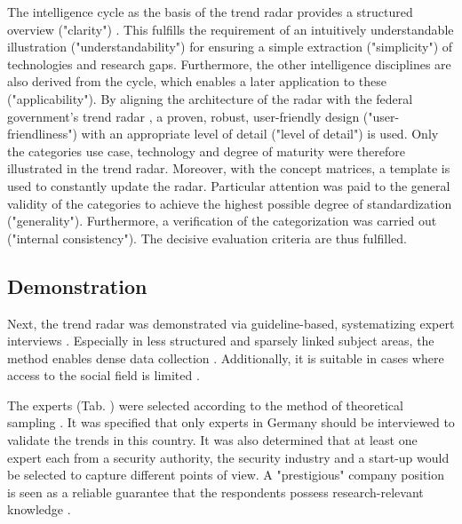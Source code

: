 \documentclass[10pt]{article}
\begin{document}
The intelligence cycle as the basis of the trend radar provides a
structured overview ("clarity") \cite{Breakspear.2013}. This
fulfills the requirement of an intuitively understandable illustration
("understandability") for ensuring a simple extraction ("simplicity")
of technologies and research gaps. Furthermore, the other intelligence
disciplines are also derived from the cycle, which enables a later
application to these ("applicability"). By aligning the
architecture of the radar with the federal government's trend radar
\cite{Stich.2022}, a proven, robust, user-friendly
design ("user-friendliness") with an appropriate level of detail
("level of detail") is used. Only the categories use case, technology and
degree of maturity were therefore illustrated in the trend radar. Moreover, with the concept matrices, a
template is used to constantly update the radar. Particular attention
was paid to the general validity of the categories to achieve
the highest possible degree of standardization ("generality").
Furthermore, a verification of the categorization was carried out ("internal consistency").
The decisive evaluation criteria \cite{vomBrocke.2020b} are thus fulfilled.

\subsection{Demonstration}

Next, the trend radar was demonstrated via guideline-based,
systematizing expert interviews \cite{Bogner.2014, Glaser.2009, Meuser.1991}.
Especially in less structured and sparsely linked subject areas, the method
enables dense data collection \cite{Bogner.2014,Meuser.1991}. Additionally,
it is suitable in cases where access to the social field is limited \cite{Bogner.2002c, Glaser.2009}.

The experts (Tab. ) were selected according to the method of
theoretical sampling \cite{Glaser.1967,Eisenhardt.1989}. It was specified that only experts in
Germany should be interviewed to validate the trends in this
country. It was also determined that at least one expert each
from a security authority, the security industry and a
start-up would be selected to capture different points of
view. A "prestigious" company position is seen as a reliable
guarantee that the respondents possess research-relevant knowledge \cite{Bogner.2002b}.
\end{document}
